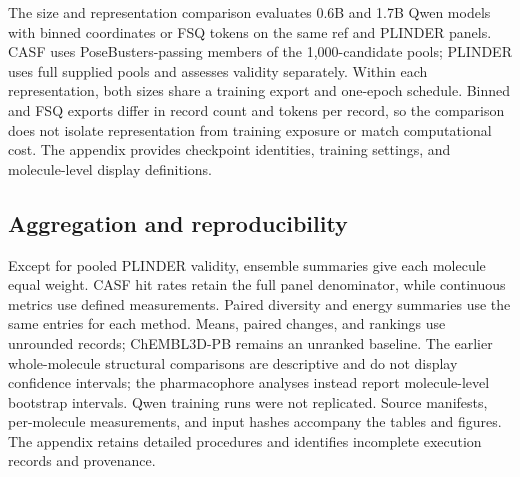 The size and representation comparison evaluates 0.6B and 1.7B Qwen models with binned
coordinates or FSQ tokens on the same ref and PLINDER panels. CASF uses PoseBusters-passing
members of the 1,000-candidate pools; PLINDER uses full supplied pools and assesses
validity separately. Within each
representation, both sizes share a training export and one-epoch schedule. Binned and
FSQ exports differ in record count and tokens per record, so the comparison does not
isolate representation from training exposure or match computational cost. The appendix
provides checkpoint identities, training settings, and molecule-level display definitions.

\subsection{Aggregation and reproducibility}

Except for pooled PLINDER validity, ensemble summaries give each molecule equal weight.
CASF hit rates retain the full panel denominator, while continuous metrics use defined
measurements. Paired diversity and energy summaries use the same entries for each
method. Means, paired changes, and rankings use unrounded records; ChEMBL3D-PB remains
an unranked baseline. The earlier whole-molecule structural comparisons are descriptive
and do not display confidence intervals; the pharmacophore analyses instead report
molecule-level bootstrap intervals. Qwen training runs were not replicated. Source
manifests, per-molecule measurements, and input hashes accompany the tables and
figures. The appendix retains detailed procedures and identifies incomplete execution
records and provenance.
